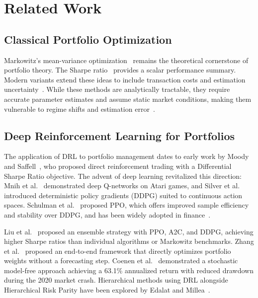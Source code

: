 \documentclass[conference]{IEEEtran}
\begin{document}
\section{Related Work}
\label{sec:related}

\subsection{Classical Portfolio Optimization}
Markowitz's mean-variance optimization~\cite{Markowitz1952} remains the
theoretical cornerstone of portfolio theory. The Sharpe ratio~\cite{Sharpe1966}
provides a scalar performance summary. Modern variants extend these ideas to include
transaction costs and estimation uncertainty~\cite{Hu2024Markowitz}. While these
methods are analytically tractable, they require accurate parameter estimates and
assume static market conditions, making them vulnerable to regime shifts and
estimation error~\cite{Huang2025EMVRS}.

\subsection{Deep Reinforcement Learning for Portfolios}
The application of DRL to portfolio management dates to early work by Moody and
Saffell~\cite{Moody2001}, who proposed direct reinforcement trading with a
Differential Sharpe Ratio objective. The advent of deep learning revitalized
this direction: Mnih et al.~\cite{Mnih2015} demonstrated deep Q-networks on
Atari games, and Silver et al.~\cite{Silver2014} introduced deterministic policy
gradients (DDPG) suited to continuous action spaces. Schulman et
al.~\cite{Schulman2017PPO} proposed PPO, which offers improved sample efficiency
and stability over DDPG, and has been widely adopted in finance~\cite{Huang2023EvalDRLBenchmark}.

Liu et al.~\cite{Liu2020Ensemble} proposed an ensemble strategy with PPO, A2C,
and DDPG, achieving higher Sharpe ratios than individual algorithms or
Markowitz benchmarks. Zhang et al.~\cite{Zhang2021Universal} proposed an
end-to-end framework that directly optimizes portfolio weights without a
forecasting step. Coenen et al.~\cite{Coenen2022Stochastic} demonstrated a
stochastic model-free approach achieving a 63.1\% annualized return with reduced
drawdown during the 2020 market crash. Hierarchical methods using DRL alongside
Hierarchical Risk Parity have been explored by Edalat and Millea~\cite{Edalat2023HRP}.
\end{document}
